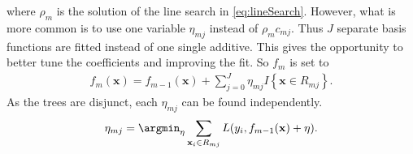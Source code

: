 where $\rho_m$ is the solution of the line search in \eqref{eq:lineSearch}.  However, what is more common is to use one variable $\eta_{m j}$ instead of $\rho_m c_{m j}$. Thus $J$ separate basis functions are fitted instead of one single additive. This gives the opportunity to better tune the coefficients and improving the fit. So $f_m$ is set to 
\begin{align}
  \label{eq:etaLineSearch} 
  f_m(\mathbf{x}) = f_{m-1}(\mathbf{x}) +  \sum^{J}_{j=0} \eta_{m j} I\left\{ \mathbf{x} \in R_{m j} \right\}.
\end{align}
As the trees are disjunct, each $\eta_{m j}$ can be found independently.
\begin{align}
  \eta_{m j} = \argmin_\eta  \sum_{\mathbf{x}_i \in R_{m j}} L(y_i, f_{m-1}(\mathbf{x}) + \eta).
\end{align}

